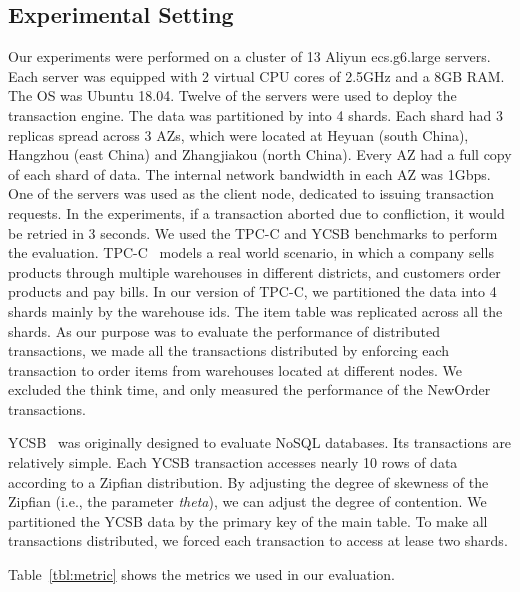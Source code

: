 \documentclass[conference]{IEEEtran}
\begin{document}
\subsection{Experimental Setting}
\label{subsec:exp_setting}
Our experiments were performed on a cluster of 13 Aliyun ecs.g6.large servers.
Each server was equipped with 2 virtual CPU cores of 2.5GHz and a 8GB RAM. The OS was Ubuntu 18.04.
Twelve of the servers were used to deploy the transaction engine.
The data was partitioned by into 4 shards. Each shard had 3 replicas spread across 3 AZs, 
which were located at Heyuan (south China), Hangzhou (east China) and Zhangjiakou (north China).
Every AZ had a full copy of each shard of data.
The internal network bandwidth in each AZ was 1Gbps.
One of the servers was used as the client node, dedicated to issuing transaction requests. 
In the experiments, if a transaction aborted due to confliction, it would be retried in 3 seconds.
We used the TPC-C and YCSB benchmarks to perform the evaluation. 
TPC-C~\cite{TPCC:conf/tpctc/NambiarWMTLCM11} models a real world scenario, in which a company sells products through multiple warehouses in different districts, and customers order products and pay bills.
In our version of TPC-C, we partitioned the data into 4 shards mainly by the warehouse ids.
The item table was replicated across all the shards.
As our purpose was to evaluate the performance of distributed transactions,
we made all the transactions distributed by enforcing each transaction to order items from warehouses located at different nodes.
We excluded the think time, and only measured the performance of the NewOrder transactions.

YCSB~\cite{YCSB:conf/cloud/CooperSTRS10} was originally designed to evaluate NoSQL databases.
Its transactions are relatively simple.
Each YCSB transaction accesses nearly 10 rows of data according to a Zipfian distribution.
By adjusting the degree of skewness of the Zipfian (i.e., the parameter \emph{theta}), we can adjust the degree of contention.
We partitioned the YCSB data by the primary key of the main table.
To make all transactions distributed, we forced each transaction to access at lease two shards.

Table~\ref{tbl:metric} shows the metrics we used in our evaluation.
\end{document}
